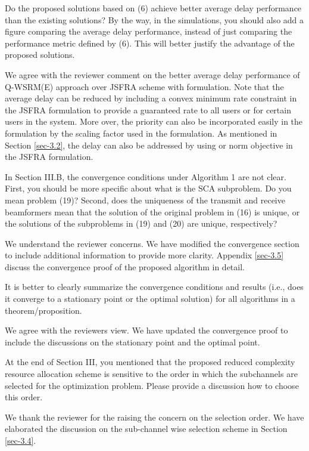  Do the proposed solutions based on (6) achieve better average delay performance than the existing solutions? By the way, in the simulations, you should also add a figure comparing the average delay performance, instead of just comparing the performance metric defined by (6). This will better justify the advantage of the proposed solutions.

\resp We agree with the reviewer comment on the better average delay performance of Q-WSRM(E) approach over JSFRA scheme with  formulation. Note that the average delay can be reduced by including a convex minimum rate constraint in the JSFRA formulation to provide a guaranteed rate to all users or for certain users in the system. More over, the priority can also be incorporated easily in the formulation by the scaling factor  used in the formulation. As mentioned in Section \ref{sec-3.2}, the delay can also be addressed by using  or  norm objective in the JSFRA formulation.

 In Section III.B, the convergence conditions under Algorithm 1 are not clear. First, you should be more specific about what is the SCA subproblem. Do you mean problem (19)? Second, does the uniqueness of the transmit and receive beamformers mean that the solution of the original problem in (16) is unique, or the solutions of the subproblems in (19) and (20) are unique, respectively?

\resp We understand the reviewer concerns. We have modified the convergence section to include additional information to provide more clarity. Appendix \ref{sec-3.5} discuss the convergence proof of the proposed algorithm in detail.

 It is better to clearly summarize the convergence conditions and results (i.e., does it converge to a stationary point or the optimal solution) for all algorithms in a theorem/proposition.

\resp We agree with the reviewers view. We have updated the convergence proof to include the discussions on the stationary point and the optimal point.

 At the end of Section III, you mentioned that the proposed reduced complexity resource allocation scheme is sensitive to the order in which the subchannels are selected for the optimization problem. Please provide a discussion how to choose this order.

\resp We thank the reviewer for the raising the concern on the selection order. We have elaborated the discussion on the sub-channel wise selection scheme in Section \ref{sec-3.4}. 

